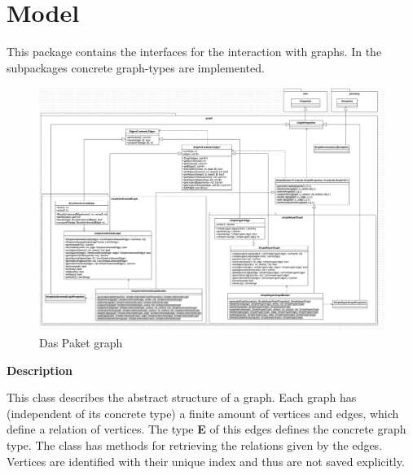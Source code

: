 	\section{Model}
	
	This package contains the interfaces for the interaction with graphs. In the subpackages concrete graph-types are implemented.
	
		\begin{figure}
	\centering
\includegraphics[width=\textwidth]{abbildungen/graph.png}

	\caption{Das Paket graph }
	\label{img:graph}
\end{figure}		
	
	
	\textbf{Description}
	
	This class describes the abstract structure of a graph. Each graph has (independent of its concrete type) a finite amount of vertices and edges, which define a relation of vertices. The type \textbf{E} of this edges defines the concrete graph type. The class has methods for retrieving the relations given by the edges. Vertices are identified with their unique index and thus are not saved explicitly.
	
